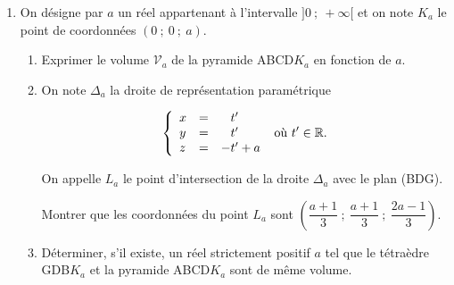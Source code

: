 \documentclass[10pt]{article}
\providecommand{\R}{\mathbb{R}}
\begin{document}
\begin{enumerate}
\item On désigne par $a$ un réel appartenant à l'intervalle $]0~;~+\infty[$ et on note $K_a$ le point de coordonnées $(0~;~0~;~a)$.
	\begin{enumerate}
		\item Exprimer le volume $\mathcal{V}_a$ de la pyramide ABCD$K_a$ en fonction de $a$.
		\item On note $\Delta_a$ la droite de représentation paramétrique 

\[
\left\{\begin{array}{l c l}x&=&\phantom{-}t' \\ y &=&\phantom{-}t' \\ z&=&- t' + a \end{array}\right. \text{ où } t' \in \R. \]

On appelle $L_a$ le point d'intersection de la droite $\Delta_a$ avec le plan (BDG).

Montrer que les coordonnées du point $L_a$ sont $\left(\dfrac{a+1}{3}~;~\dfrac{a+1}{3}~;~\dfrac{2a-1}{3}\right)$.
		\item Déterminer, s'il existe, un réel strictement positif $a$ tel que le tétraèdre GDB$K_a$ et la pyramide ABCD$K_a$ sont de même volume.
	\end{enumerate}
\end{enumerate}
\end{document}
